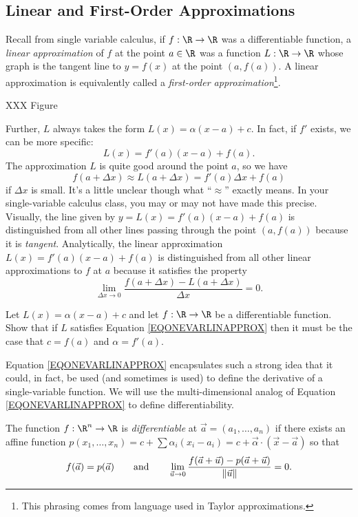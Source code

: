 \subsection{Linear and First-Order Approximations}

Recall from single variable calculus, if $f:\R\to\R$ was a differentiable function,
a \emph{linear approximation} of $f$ at the point $a\in\R$ was a function $L:\R\to\R$
whose graph is the tangent line to $y=f(x)$ at the point $(a,f(a))$.  A linear approximation
is equivalently called a \emph{first-order approximation}\footnote{ This phrasing comes from
language used in Taylor approximations.}.

XXX Figure

Further, $L$ always takes the form $L(x)=\alpha(x-a)+c$.  In fact, if $f'$ exists,
we can be more
specific:  \[L(x)=f'(a)(x-a)+f(a).\]
The approximation $L$ is quite good around the point $a$, so we have
\[
	f(a+\Delta x)\approx L(a+\Delta x) = f'(a)\Delta x+f(a)
\]
if $\Delta x$ is small.  It's a little unclear though what ``$\approx$''
exactly means.  In your single-variable calculus class, you may or may not
have made this precise.  Visually, the line given by $y=L(x)=f'(a)(x-a)+f(a)$
is distinguished from all other lines passing through the point $(a,f(a))$ because
it is \emph{tangent}.  Analytically, the linear approximation $L(x)=f'(a)(x-a)+f(a)$
is distinguished from all other linear approximations to $f$ at $a$ because it satisfies
the property
\begin{equation}
	\label{EQONEVARLINAPPROX}
	\lim_{\Delta x\to 0} \frac{f(a+\Delta x)-L(a+\Delta x)}{\Delta x} = 0.
\end{equation}

\begin{exercise}
	Let $L(x)=\alpha(x-a)+c$ and let $f:\R\to\R$ be a differentiable function.
	Show that if $L$ satisfies Equation \eqref{EQONEVARLINAPPROX} then it
	must be the case that $c=f(a)$ and $\alpha=f'(a)$.
\end{exercise}

Equation \eqref{EQONEVARLINAPPROX} encapsulates such a strong idea that
it could, in fact, be used (and sometimes is used) to define the derivative
of a single-variable function.  We will use the multi-dimensional
analog of Equation \eqref{EQONEVARLINAPPROX} to define differentiability.

\begin{definition}[Differentiable]
	The function $f:\R^n\to \R$ is 
	\emph{differentiable}
	at $\vec a=(a_1,\ldots,a_n)$ if there exists
	an affine function $p(x_1,\ldots, x_n)
	= c+\sum \alpha_i (x_i-a_i) = c+\vec \alpha \cdot(\vec x-\vec a)$ so that
	\[
		f(\vec a)=p(\vec a)\qquad\text{and}\qquad\lim_{\vec u\to0} \frac{f(\vec a + \vec u)-p(\vec a + \vec u)}{\lVert\vec u\rVert} = 0.
	\]
\end{definition}

